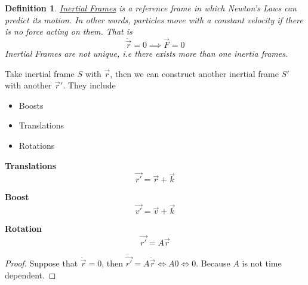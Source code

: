 \documentclass{article}
\newtheorem{definition}[theorem]{Definition}
\newtheorem{one minute paper}[theorem]{One Minute Paper}
\begin{document}
\begin{definition}
    \underline{Inertial Frames} is a reference frame in which Newton's Laws can predict its motion. In other words, particles move with a constant velocity if there is no force acting on them. That is
    \begin{equation}
        \ddot{\vec{r}} = 0 \implies \vec{F} = 0
    \end{equation} 
    Inertial Frames are not unique, i.e there exists more than one inertia frames.
\end{definition}

Take inertial frame $S$ with $\vec{r}$, then we can construct another inertial frame $S'$ with another $\vec{r}'$. 
They include
\begin{itemize}
    \item Boosts
    \item Translations
    \item Rotations
\end{itemize}

\textbf{Translations}
\begin{equation}
    \vec{r'} = \vec{r} + \vec{k}
\end{equation}

\textbf{Boost}
\begin{equation}
    \vec{v'} = \vec{v} + \vec{k}
\end{equation}

\textbf{Rotation}
\begin{equation}
    \vec{r'} = A\vec{r}
\end{equation}
\begin{proof}
    Suppose that $\ddot{\vec{r}} = 0$, then $\ddot{\vec{r'}} = A\ddot{\vec{r}} \iff A0 \iff 0$. Because $A$ is not time dependent.  
\end{proof}
\end{document}
